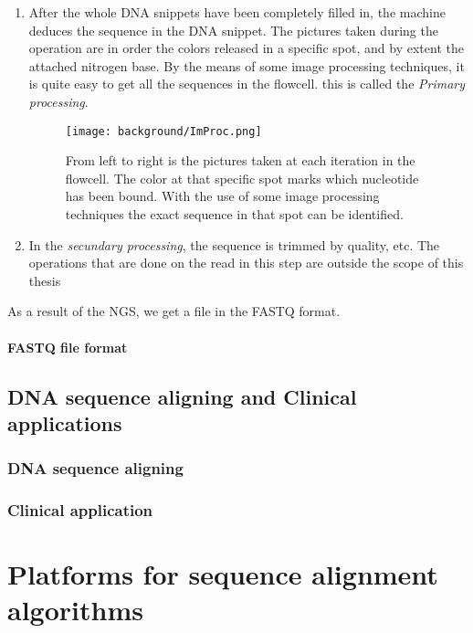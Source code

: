 \begin{enumerate}
	\item After the whole DNA snippets have been completely filled in, the machine deduces the sequence in the DNA snippet. The pictures taken during the operation are in order the colors released in a specific spot, and by extent the attached nitrogen base. By the means of some image processing techniques, it is quite easy to get all the sequences in the flowcell. this is called the \emph{Primary processing}.
	
	\begin{figure}[!ht]
		\centering
		\texttt{[image: background/ImProc.png]}
		\caption{From left to right is the pictures taken at each iteration in the flowcell. The color at that specific spot marks which nucleotide has been bound. With the use of some image processing techniques the exact sequence in that spot can be identified.}
		\label{fig:ImProc}
	\end{figure}
	
	\item In the \emph{secundary processing}, the sequence is trimmed by quality, etc. The operations that are done on the read in this step are outside the scope of this thesis
\end{enumerate}

As a result of the NGS, we get a file in the FASTQ format.

\paragraph{FASTQ file format}



\subsection{DNA sequence aligning and Clinical applications}

\subsubsection{DNA sequence aligning}

\subsubsection{Clinical application}



\section{Platforms for sequence alignment algorithms}

